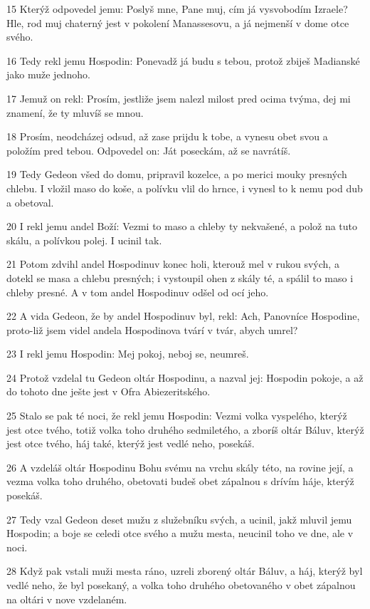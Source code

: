\par 15 Kterýž odpovedel jemu: Poslyš mne, Pane muj, cím já vysvobodím Izraele? Hle, rod muj chaterný jest v pokolení Manassesovu, a já nejmenší v dome otce svého.
\par 16 Tedy rekl jemu Hospodin: Ponevadž já budu s tebou, protož zbiješ Madianské jako muže jednoho.
\par 17 Jemuž on rekl: Prosím, jestliže jsem nalezl milost pred ocima tvýma, dej mi znamení, že ty mluvíš se mnou.
\par 18 Prosím, neodcházej odsud, až zase prijdu k tobe, a vynesu obet svou a položím pred tebou. Odpovedel on: Ját poseckám, až se navrátíš.
\par 19 Tedy Gedeon všed do domu, pripravil kozelce, a po merici mouky presných chlebu. I vložil maso do koše, a polívku vlil do hrnce, i vynesl to k nemu pod dub a obetoval.
\par 20 I rekl jemu andel Boží: Vezmi to maso a chleby ty nekvašené, a polož na tuto skálu, a polívkou polej. I ucinil tak.
\par 21 Potom zdvihl andel Hospodinuv konec holi, kterouž mel v rukou svých, a dotekl se masa a chlebu presných; i vystoupil ohen z skály té, a spálil to maso i chleby presné. A v tom andel Hospodinuv odšel od ocí jeho.
\par 22 A vida Gedeon, že by andel Hospodinuv byl, rekl: Ach, Panovníce Hospodine, proto-liž jsem videl andela Hospodinova tvárí v tvár, abych umrel?
\par 23 I rekl jemu Hospodin: Mej pokoj, neboj se, neumreš.
\par 24 Protož vzdelal tu Gedeon oltár Hospodinu, a nazval jej: Hospodin pokoje, a až do tohoto dne ješte jest v Ofra Abiezeritského.
\par 25 Stalo se pak té noci, že rekl jemu Hospodin: Vezmi volka vyspelého, kterýž jest otce tvého, totiž volka toho druhého sedmiletého, a zboríš oltár Báluv, kterýž jest otce tvého, háj také, kterýž jest vedlé neho, posekáš.
\par 26 A vzdeláš oltár Hospodinu Bohu svému na vrchu skály této, na rovine její, a vezma volka toho druhého, obetovati budeš obet zápalnou s drívím háje, kterýž posekáš.
\par 27 Tedy vzal Gedeon deset mužu z služebníku svých, a ucinil, jakž mluvil jemu Hospodin; a boje se celedi otce svého a mužu mesta, neucinil toho ve dne, ale v noci.
\par 28 Když pak vstali muži mesta ráno, uzreli zborený oltár Báluv, a háj, kterýž byl vedlé neho, že byl posekaný, a volka toho druhého obetovaného v obet zápalnou na oltári v nove vzdelaném.
